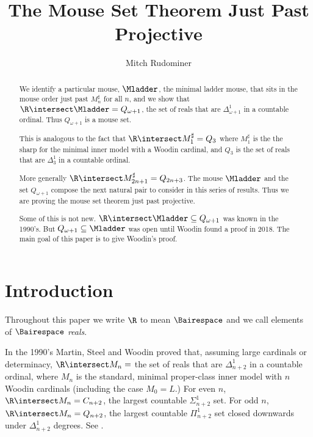 \documentclass[oneside,12pt]{amsart}
\begin{document}
\title{The Mouse Set Theorem Just Past Projective}
\author{Mitch Rudominer}


\begin{abstract}
We identify a particular mouse, $\Mladder$, the minimal ladder mouse,
that sits in the mouse order just past $M_n^{\sharp}$ for all $n$,
 and we show that $\R\intersect \Mladder = Q_{\omega+1}$,
 the set of reals that are
$\Delta^1_{\omega+1}$ in a countable ordinal. Thus $Q_{\omega+1}$
is a mouse set.

This is analogous to the fact that $\R\intersect M^{\sharp}_1 = Q_3$ where $M^{\sharp}_1$ is the
the sharp for the minimal inner model with a Woodin cardinal, and $Q_3$ is the set of reals
that are $\Delta^1_3$ in a countable ordinal.

More generally $\R\intersect M^{\sharp}_{2n+1} = Q_{2n+3}$.
The mouse $\Mladder$ and the set $Q_{\omega+1}$  compose the next natural
pair to consider in this series of results. Thus we are proving the mouse
set theorem just past projective.

Some of this is not new. $\R\intersect \Mladder \subseteq Q_{\omega+1}$ was
known in the 1990's. But $Q_{\omega+1} \subseteq \Mladder$ was open
until Woodin found a proof in 2018. The main goal of this paper is to give
Woodin's proof.
\end{abstract}

\maketitle

\tableofcontents

\section{Introduction}
\label{section:intro}
Throughout this paper we write $\R$ to mean $\Bairespace$ and we call elements of $\Bairespace$ \emph{reals}.

In the 1990's Martin, Steel and Woodin proved that, assuming large cardinals or determinacy,
$\R\intersect M_n = $ the set of reals that are $\Delta^1_{n+2}$ in a countable ordinal,
where $M_n$ is the standard, minimal proper-class inner model with $n$ Woodin cardinals (including the case $M_0=L$.)
For even $n$, $\R\intersect M_n = C_{n+2}$, the largest countable $\Sigma^1_{n+2}$ set.
For odd $n$, $\R\intersect M_n = Q_{n+2}$, the largest countable $\Pi^1_{n+2}$
set closed downwards under $\Delta^1_{n+2}$ degrees. See \cite{Proj_WO_In_Mod}.
\end{document}
